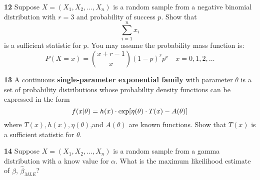 \documentclass{amsart}
\begin{document}
\par\vspace{1 cm}\noindent
\textbf{12}  Suppose $X=(X_1,X_2,\ldots,X_n)$ is a random sample from a negative binomial distribution with $r=3$ and probability of success $p$.  Show that
\[
\sum_{i=1}^nx_i
\]
is a sufficient statistic for $p$.  You may assume the probability mass function is:
\[
P(X=x) = {x+r-1\choose x}(1-p)^rp^x\quad x=0,1,2,\ldots
\]
\par\vspace{1 cm}\noindent
\textbf{13}  A continuous \textbf{single-parameter exponential family} with parameter $\theta$ is a set of probability distributions whose probability density functions can be expressed in the form
\[
f(x|\theta) = h(x)\cdot\exp[\eta(\theta)\cdot T(x)-A(\theta)]
\vspace{0.4 cm}
\]
where $T(x),h(x),\eta(\theta)$,and $A(\theta)$ are known functions. Show that $T(x)$ is a sufficient statistic for $\theta$.
\par\vspace{1 cm}\noindent
\textbf{14}  Suppose $X=(X_1,X_2,\ldots,X_n)$ is a random sample from a gamma distribution with a know value for $\alpha$.  What is the maximum likeilihood estimate of $\beta$, $\hat{\beta}_{MLE}$? 
\end{document}
